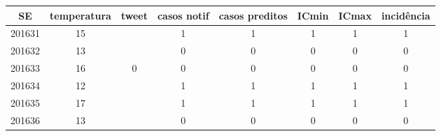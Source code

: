 \begin{tabular}{c|ccccccc}
  \hline
SE & temperatura & tweet & casos notif & casos preditos & ICmin & ICmax & incidência \\ 
  \hline
201631 & 15 &  & 1 & 1 & 1 & 1 & 1 \\ 
  201632 & 13 &  & 0 & 0 & 0 & 0 & 0 \\ 
  201633 & 16 & 0 & 0 & 0 & 0 & 0 & 0 \\ 
  201634 & 12 &  & 1 & 1 & 1 & 1 & 1 \\ 
  201635 & 17 &  & 1 & 1 & 1 & 1 & 1 \\ 
  201636 & 13 &  & 0 & 0 & 0 & 0 & 0 \\ 
   \hline
\end{tabular}

